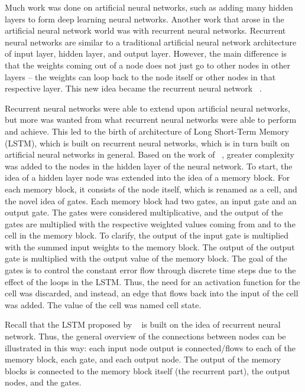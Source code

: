 \documentclass[11pt,letterpaper]{article}
\begin{document}
Much work was done on artificial neural networks, such as adding many hidden layers to form deep learning neural networks. Another work that arose in the artificial neural network world was with recurrent neural networks. Recurrent neural networks are similar to a traditional artificial neural network architecture of input layer, hidden layer, and output layer. However, the main difference is that the weights coming out of a node does not just go to other nodes in other layers -- the weights can loop back to the node itself or other nodes in that respective layer. This new idea became the recurrent neural network ~\cite{Elman:90}. 
 
Recurrent neural networks were able to extend upon artificial neural networks, but more was wanted from what recurrent neural networks were able to perform and achieve. This led to the birth of architecture of Long Short-Term Memory (LSTM), which is built on recurrent neural networks, which is in turn built on artificial neural networks in general. Based on the work of ~\cite{Hochreiter:97}, greater complexity was added to the nodes in the hidden layer of the neural network. To start, the idea of a hidden layer node was extended into the idea of a memory block. For each memory block, it consists of the node itself, which is renamed as a cell, and the novel idea of gates. Each memory block had two gates, an input gate and an output gate. The gates were considered multiplicative, and the output of the gates are multiplied with the respective weighted values coming from and to the cell in the memory block. To clarify, the output of the input gate is multiplied with the summed input weights to the memory block. The output of the output gate is multiplied with the output value of the memory block. The goal of the gates is to control the constant error flow through discrete time steps due to the effect of the loops in the LSTM. Thus, the need for an activation function for the cell was discarded, and instead, an edge that flows back into the input of the cell was added. The value of the cell was named cell state.

Recall that the LSTM proposed by ~\cite{Hochreiter:97} is built on the idea of recurrent neural network. Thus, the general overview of the connections between nodes can be illustrated in this way: each input node output is connected/flows to each of the memory block, each gate, and each output node. The output of the memory blocks is connected to the memory block itself (the recurrent part), the output nodes, and the gates. 
\end{document}
